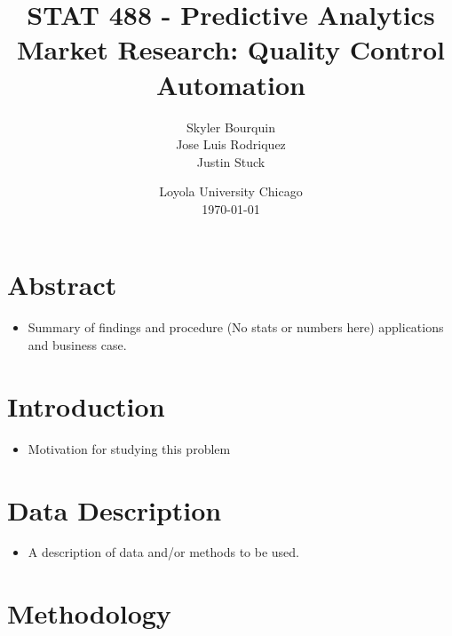 \documentclass[12pt]{article} %
\title{STAT 488 - Predictive Analytics \\ Market Research: Quality Control Automation } %
\author{
Skyler Bourquin \\
Jose Luis Rodriquez \\
Justin Stuck \\
} %
\date{Loyola University Chicago \\ \today } %
\begin{document}
\maketitle

\thispagestyle{fancy}


\section{Abstract}
\begin{itemize}
\item Summary of findings and procedure (No stats or numbers here) applications and business case.
\end{itemize}


\section{Introduction}
\begin{itemize}
\item Motivation for studying this problem
\end{itemize}



\section{Data Description}

\begin{itemize}
\item A description of data and/or methods to be used.
\end{itemize}



\section{Methodology}
\end{document}

